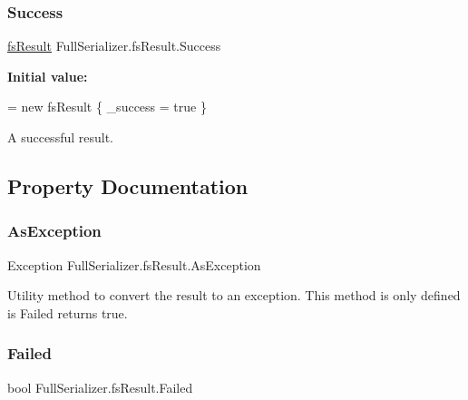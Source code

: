 \subsubsection{\texorpdfstring{Success}{Success}}
{\footnotesize\ttfamily \hyperlink{struct_full_serializer_1_1fs_result}{fs\+Result} Full\+Serializer.\+fs\+Result.\+Success\hspace{0.3cm}{\ttfamily [static]}}

{\bfseries Initial value\+:}
\begin{DoxyCode}
= \textcolor{keyword}{new} fsResult
        \{
            \_success = \textcolor{keyword}{true}
        \}
\end{DoxyCode}


A successful result. 



\subsection{Property Documentation}
\mbox{\label{struct_full_serializer_1_1fs_result_a9bde651297a47eb80ca1e6d14d3647f2}} 
\subsubsection{\texorpdfstring{As\+Exception}{AsException}}
{\footnotesize\ttfamily Exception Full\+Serializer.\+fs\+Result.\+As\+Exception\hspace{0.3cm}{\ttfamily [get]}}



Utility method to convert the result to an exception. This method is only defined is {\ttfamily Failed} returns true. 

\mbox{\label{struct_full_serializer_1_1fs_result_ac6770cd3b068004050fc45f82736564c}} 
\subsubsection{\texorpdfstring{Failed}{Failed}}
{\footnotesize\ttfamily bool Full\+Serializer.\+fs\+Result.\+Failed\hspace{0.3cm}{\ttfamily [get]}}



